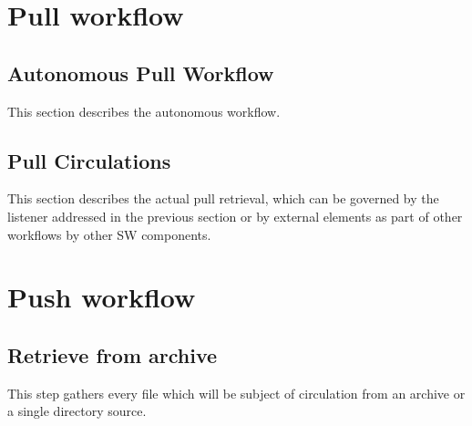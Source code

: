 \documentclass[dec_sum_main.tex]{subfiles}
\begin{document}
\section{Pull workflow}

\subsection{Autonomous Pull Workflow}
This section describes the autonomous workflow.

\subsection{Pull Circulations}
This section describes the actual pull retrieval, which can be governed by the listener addressed in the previous section or by external elements as part of other workflows by other SW components.

\section{Push workflow}

\subsection{Retrieve from archive}
This step gathers every file which will be subject of circulation from an archive or a single directory source.
\end{document}
